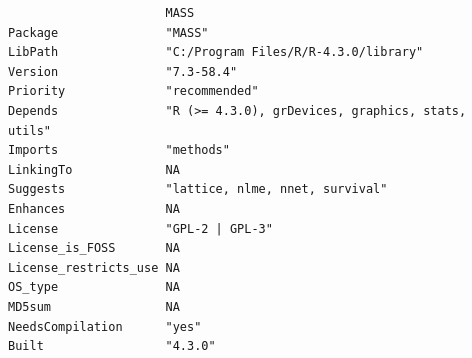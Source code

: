 \documentclass[
  letterpaper,
  DIV=11,
  numbers=noendperiod]{scrreprt}
\newenvironment{Shaded}{\begin{snugshade}}{\end{snugshade}}
\newcommand{\CommentTok}[1]{\textcolor[rgb]{0.37,0.37,0.37}{#1}}
\newcommand{\FunctionTok}[1]{\textcolor[rgb]{0.28,0.35,0.67}{#1}}
\newcommand{\NormalTok}[1]{\textcolor[rgb]{0.00,0.23,0.31}{#1}}
\newcommand{\SpecialCharTok}[1]{\textcolor[rgb]{0.37,0.37,0.37}{#1}}
\newcommand{\StringTok}[1]{\textcolor[rgb]{0.13,0.47,0.30}{#1}}
\begin{document}
\begin{verbatim}
                      MASS                                             
Package               "MASS"                                           
LibPath               "C:/Program Files/R/R-4.3.0/library"             
Version               "7.3-58.4"                                       
Priority              "recommended"                                    
Depends               "R (>= 4.3.0), grDevices, graphics, stats, utils"
Imports               "methods"                                        
LinkingTo             NA                                               
Suggests              "lattice, nlme, nnet, survival"                  
Enhances              NA                                               
License               "GPL-2 | GPL-3"                                  
License_is_FOSS       NA                                               
License_restricts_use NA                                               
OS_type               NA                                               
MD5sum                NA                                               
NeedsCompilation      "yes"                                            
Built                 "4.3.0"                                          
\end{verbatim}

\begin{Shaded}
\end{Shaded}
\end{document}
